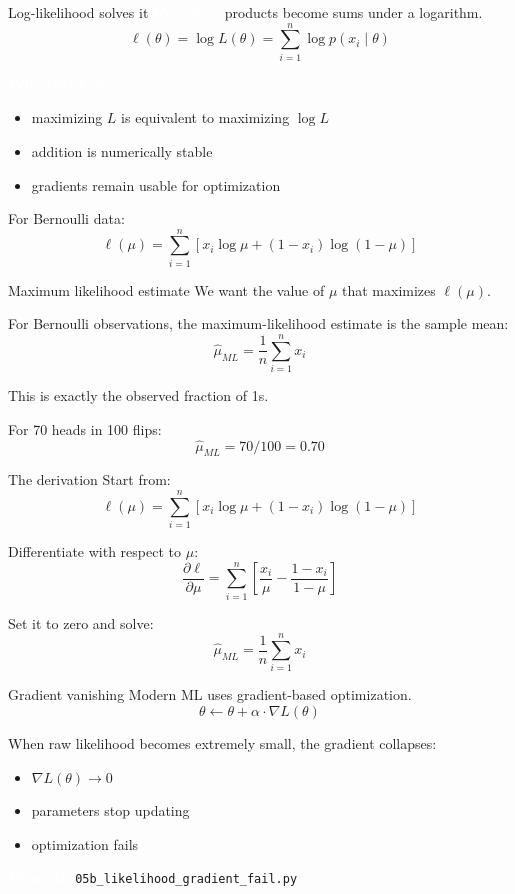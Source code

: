 \documentclass[aspectratio=169]{beamer}
\renewcommand{\textbf}[1]{\textcolor{white}{\bfseries #1}}
\begin{document}
\begin{frame}[c]{Log-likelihood solves it}
\textbf{Key idea:} products become sums under a logarithm.
\[
\ell(\theta)=\log L(\theta)=\sum_{i=1}^n \log p(x_i\mid \theta)
\]

\vspace{0.5em}
\textbf{Why this helps:}
\begin{itemize}
    \item maximizing $L$ is equivalent to maximizing $\log L$
    \item addition is numerically stable
    \item gradients remain usable for optimization
\end{itemize}

\vspace{0.5em}
For Bernoulli data:
\[
\ell(\mu)=\sum_{i=1}^n \left[x_i\log\mu + (1-x_i)\log(1-\mu)\right]
\]
\end{frame}

\begin{frame}[c]{Maximum likelihood estimate}
We want the value of $\mu$ that maximizes $\ell(\mu)$.

\vspace{0.5em}
For Bernoulli observations, the maximum-likelihood estimate is the sample mean:
\[
\hat{\mu}_{ML} = \frac{1}{n}\sum_{i=1}^n x_i
\]

\vspace{0.5em}
This is exactly the observed fraction of 1s.

\vspace{0.5em}
For 70 heads in 100 flips:
\[
\hat{\mu}_{ML} = 70/100 = 0.70
\]
\end{frame}

\begin{frame}[c]{The derivation}
Start from:
\[
\ell(\mu)=\sum_{i=1}^n \left[x_i\log\mu + (1-x_i)\log(1-\mu)\right]
\]

Differentiate with respect to $\mu$:
\[
\frac{\partial \ell}{\partial \mu}
=\sum_{i=1}^n\left[\frac{x_i}{\mu} - \frac{1-x_i}{1-\mu}\right]
\]

Set it to zero and solve:
\[
\hat{\mu}_{ML}=\frac{1}{n}\sum_{i=1}^n x_i
\]
\end{frame}

\begin{frame}[c]{Gradient vanishing}
Modern ML uses gradient-based optimization.
\[
\theta \leftarrow \theta + \alpha \cdot \nabla L(\theta)
\]

\vspace{0.5em}
When raw likelihood becomes extremely small, the gradient collapses:
\begin{itemize}
    \item $\nabla L(\theta) \rightarrow 0$
    \item parameters stop updating
    \item optimization fails
\end{itemize}

\vspace{0.5em}
\textbf{Demo B:} \texttt{05b\_likelihood\_gradient\_fail.py}
\end{frame}
\end{document}
